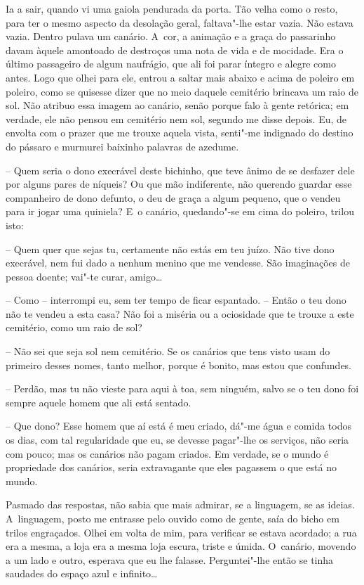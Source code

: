 Ia a sair, quando vi uma gaiola pendurada da porta. Tão velha como o
resto, para ter o mesmo aspecto da desolação geral, faltava"-lhe estar
vazia. Não estava vazia. Dentro pulava um canário. A~cor, a animação e a
graça do passarinho davam àquele amontoado de destroços uma nota de vida
e de mocidade. Era o último passageiro de algum naufrágio, que ali foi
parar íntegro e alegre como antes. Logo que olhei para ele, entrou a
saltar mais abaixo e acima de poleiro em poleiro, como se quisesse dizer
que no meio daquele cemitério brincava um raio de sol. Não atribuo essa
imagem ao canário, senão porque falo à gente retórica; em verdade, ele
não pensou em cemitério nem sol, segundo me disse depois. Eu, de envolta
com o prazer que me trouxe aquela vista, senti"-me indignado do destino
do pássaro e murmurei baixinho palavras de azedume.

-- Quem seria o dono execrável deste bichinho, que teve ânimo de se
desfazer dele por alguns pares de níqueis? Ou que mão indiferente, não
querendo guardar esse companheiro de dono defunto, o deu de graça a
algum pequeno, que o vendeu para ir jogar uma quiniela? E~o canário,
quedando"-se em cima do poleiro, trilou isto:

-- Quem quer que sejas tu, certamente não estás em teu juízo. Não tive
dono execrável, nem fui dado a nenhum menino que me vendesse. São
imaginações de pessoa doente; vai"-te curar, amigo\ldots{}

-- Como -- interrompi eu, sem ter tempo de ficar espantado. -- Então o
teu dono não te vendeu a esta casa? Não foi a miséria ou a ociosidade
que te trouxe a este cemitério, como um raio de sol?

-- Não sei que seja sol nem cemitério. Se os canários que tens visto
usam do primeiro desses nomes, tanto melhor, porque é bonito, mas estou
que confundes.

-- Perdão, mas tu não vieste para aqui à toa, sem ninguém, salvo se o
teu dono foi sempre aquele homem que ali está sentado.

-- Que dono? Esse homem que aí está é meu criado, dá"-me água e comida
todos os dias, com tal regularidade que eu, se devesse pagar"-lhe os
serviços, não seria com pouco; mas os canários não pagam criados. Em
verdade, se o mundo é propriedade dos canários, seria extravagante que
eles pagassem o que está no mundo.

Pasmado das respostas, não sabia que mais admirar, se a linguagem, se as
ideias. A~linguagem, posto me entrasse pelo ouvido como de gente, saía
do bicho em trilos engraçados. Olhei em volta de mim, para verificar se
estava acordado; a rua era a mesma, a loja era a mesma loja escura,
triste e úmida. O~canário, movendo a um lado e outro, esperava que eu
lhe falasse. Perguntei"-lhe então se tinha saudades do espaço azul e
infinito\ldots{}

